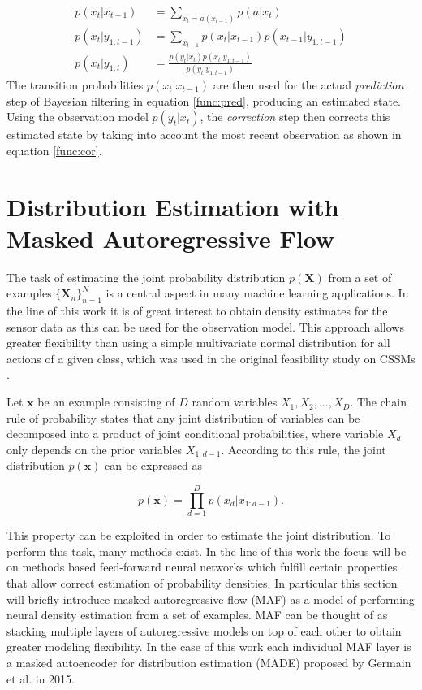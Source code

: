 \documentclass[11pt,titlepage,oneside,openany]{book}
\begin{document}
\begin{align}
	p(x_t|x_{t-1}) &= \sum_{x_t = a(x_{t-1})}^{} p(a|x_t) \label{func:traprob} \\
	p(x_t|y_{1:t-1}) &= \sum_{x_{t-1}} p(x_t|x_{t-1}) p(x_{t-1}|y_{1:t-1}) \label{func:pred} \\
	p(x_t|y_{1:t}) &= \frac{p(y_t|x_t) p(x_t|y_{1:t-1})}{p(y_t|y_{1:t-1})} \label{func:cor}
\end{align}
The transition probabilities $p(x_t|x_{t-1})$ are then used for the actual \emph{prediction} step of Bayesian filtering in equation \ref{func:pred}, producing an estimated state. Using the observation model $p(y_t|x_t)$, the \emph{correction} step then corrects this estimated state by taking into account the most recent observation as shown in equation \ref{func:cor}.

\section{Distribution Estimation with Masked Autoregressive Flow}
\label{sec:maf}
The task of estimating the joint probability distribution $p(\pmb{X})$ from a set of examples $\{\pmb{X}_n\}^N_{n=1}$ is a central aspect in many machine learning applications. In the line of this work it is of great interest to obtain density estimates for the sensor data as this can be used for the observation model. This approach allows greater flexibility than using a simple multivariate normal distribution for all actions of a given class, which was used in the original feasibility study on CSSMs \cite{kruger_computational_2014}.

Let $\pmb{x}$ be an example consisting of $D$ random variables $X_1, X_2,...,X_D$. The chain rule of probability states that any joint distribution of variables can be decomposed into a product of joint conditional probabilities, where variable $X_d$ only depends on the prior variables $X_{1:d-1}$. According to this rule, the joint distribution $p(\pmb{x})$ can be expressed as

\begin{equation}
	\label{func:chain}
	p(\pmb{x}) = \prod_{d=1}^{D} p(x_d|x_{1:d-1}).
\end{equation}

\noindent This property can be exploited in order to estimate the joint distribution. To perform this task, many methods exist. In the line of this work the focus will be on methods based feed-forward neural networks which fulfill certain properties that allow correct estimation of probability densities. In particular this section will briefly introduce masked autoregressive flow (MAF) \cite{papamakarios_masked_2017} as a model of performing neural density estimation from a set of examples. MAF can be thought of as stacking multiple layers of autoregressive models on top of each other to obtain greater modeling flexibility. In the case of this work each individual MAF layer is a masked autoencoder for distribution estimation (MADE) \cite{germain_made_nodate} proposed by Germain et al. in 2015.
\end{document}
